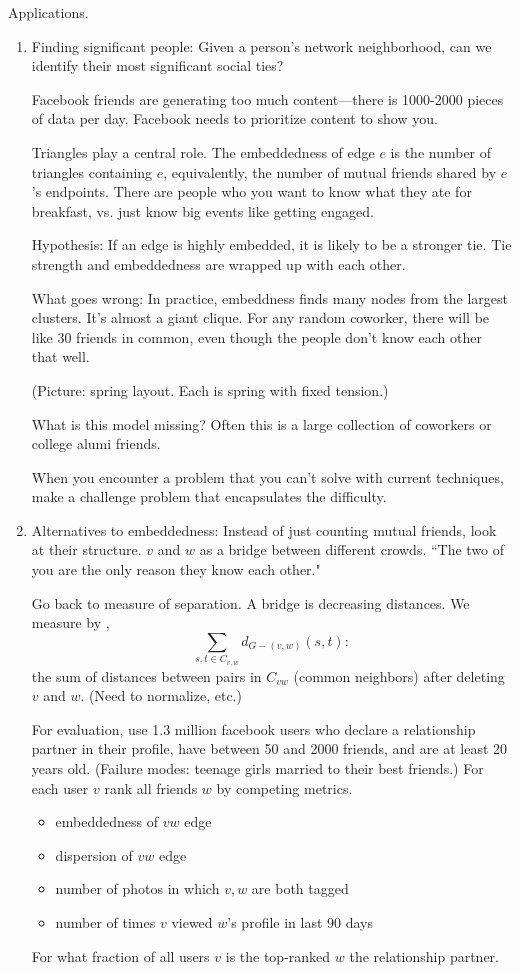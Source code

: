 Applications.
\begin{enumerate}
\item
Finding significant people: Given a person's network neighborhood, can we identify their most significant social ties?

Facebook friends are generating too much content---there is 1000-2000 pieces of data per day. Facebook needs to prioritize content to show you.

Triangles play a central role. The embeddedness of edge $e$ is the number of triangles containing $e$, equivalently, the number of mutual friends shared by $e$'s endpoints. 
There are people who you want to know what they ate for breakfast, vs. just know big events like getting engaged.

Hypothesis: If an edge is highly embedded, it is likely to be a stronger tie. Tie strength and embeddedness are wrapped up with each other.

What goes wrong: In practice, embeddness finds many nodes from the largest clusters. It's almost a giant clique. For any random coworker, there will be like 30 friends in common, even though the people don't know each other that well.

(Picture: spring layout. Each is spring with fixed tension.)

What is this model missing? Often this is a large collection of coworkers or college alumi friends. 

When you encounter a problem that you can't solve with current techniques, make a challenge problem that encapsulates the difficulty.  
\item
Alternatives to embeddedness: Instead of just counting mutual friends, look at their structure. $v$ and $w$ as a bridge between different crowds. ``The two of you are the only reason they know each other."

Go back to measure of separation. A bridge is decreasing distances. We measure by ,
\[
\sum_{s,t\in C_{v,w}} d_{G-(v,w)}(s,t):
\]
the sum of distances between pairs in $C_{vw}$ (common neighbors) after deleting $v$ and $w$. (Need to normalize, etc.)

For evaluation, use 1.3 million facebook users who declare a relationship partner in their profile, have between 50 and 2000 friends, and are at least 20 years old. (Failure modes: teenage girls married to their best friends.) For each user $v$ rank all friends $w$ by competing metrics.
\begin{itemize}
\item
embeddedness of $vw$ edge
\item
dispersion of $vw$ edge
\item
number of photos in which $v,w$ are both tagged
\item
number of times $v$ viewed $w$'s profile in last 90 days
\end{itemize}
For what fraction of all users $v$ is the top-ranked $w$ the relationship partner.


\end{enumerate}
